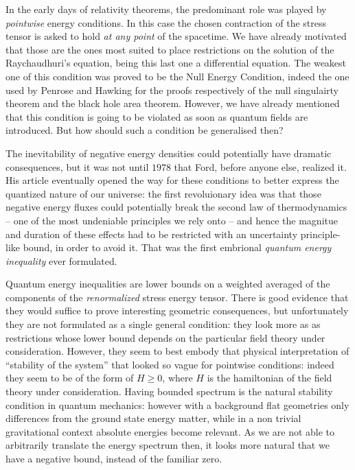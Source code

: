 In the early days of relativity theorems, the predominant role was played by \emph{pointwise} energy conditions. In this case the chosen contraction of the stress tensor is asked to hold \emph{at any point} of the spacetime. We have already motivated that those are the ones most suited to place restrictions on the solution of the Raychaudhuri's equation, being this last one a differential equation. The weakest one of this condition was proved to be the Null Energy Condition, indeed the one used by Penrose and Hawking for the proofs respectively of the null singulairty theorem and the black hole area theorem. However, we have already mentioned that this condition is going to be violated as soon as quantum fields are introduced. But how should such a condition be generalised then?

The inevitability of negative energy densities could potentially have dramatic consequences, but it was not until \(1978\) that Ford, before anyone else, realized it. His article eventually opened the way for these conditions to better express the quantized nature of our universe: the first revoluionary idea was that those negative energy fluxes could potentially break the second law of thermodynamics -- one of the most undeniable principles we rely onto -- and hence the magnitue and duration of these effects had to be restricted with an uncertainty principle-like bound, in order to avoid it. That was the first embrional \emph{quantum energy inequality} ever formulated.

Quantum energy inequalities are lower bounds on a weighted averaged of the components of the \emph{renormalized} stress energy tensor. There is good evidence that they would suffice to prove interesting geometric consequences, but unfortunately they are not formulated as a single general condition: they look more as as restrictions whose lower bound depends on the particular field theory under consideration. However, they seem to best embody that physical interpretation of ``stability of the system'' that looked so vague for pointwise conditions: indeed they seem to be of the form of \(H\ge 0\), where \(H\) is the hamiltonian of the field theory under consideration. Having bounded spectrum is the natural stability condition in quantum mechanics: however with a background flat geometries only differences from the ground state energy matter, while in a non trivial gravitational context absolute energies become relevant. As we are not able to arbitrarily translate the energy spectrum then, it looks more natural that we have a negative bound, instead of the familiar zero.

